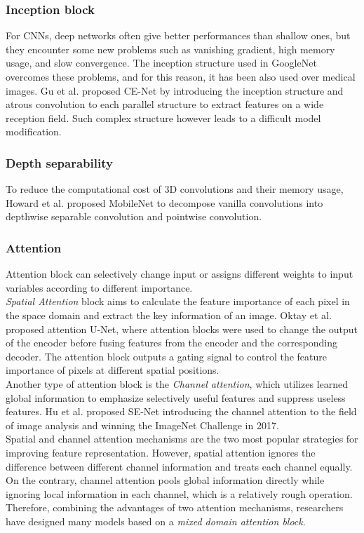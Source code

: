 \subsubsection{Inception block}
For CNNs, deep networks often give better performances than shallow ones, but they encounter some new problems such as vanishing gradient, high memory usage, and slow convergence. The inception structure used in GoogleNet overcomes these problems, and for this reason, it has been also used over medical images. Gu et al. proposed CE-Net by introducing the inception structure and atrous convolution to each parallel structure to extract features on a wide reception field. Such complex structure however leads to a difficult model modification.

\subsubsection{Depth separability}
To reduce the computational cost of 3D convolutions and their memory usage,
Howard et al. proposed MobileNet to decompose vanilla convolutions into
depthwise separable convolution and pointwise convolution.

\subsubsection{Attention}
\par
Attention block can selectively change input or assigns different weights to
input variables according to different importance.\\
\emph{Spatial Attention} block aims
to calculate the feature importance of each pixel in the space domain and extract
the key information of an image. Oktay et al. proposed attention U-Net, where
attention blocks were used to change the output of the encoder before fusing
features from the encoder and the corresponding decoder. The attention block
outputs a gating signal to control the feature importance of pixels at different
spatial positions.\\
Another type of attention block is the \emph{Channel attention},
which utilizes learned global information to emphasize selectively useful
features and suppress useless features. Hu et al. proposed SE-Net
introducing the channel attention to the field of image analysis and winning the
ImageNet Challenge in 2017.\\
Spatial and channel attention mechanisms are the two most popular strategies for
improving feature representation. However, spatial attention ignores the
difference between different channel information and treats each channel equally. On
the contrary, channel attention pools global information directly while
ignoring local information in each channel, which is a relatively rough
operation. Therefore, combining the advantages of two attention mechanisms,
researchers have designed many models based on a \emph{mixed domain attention block}.

